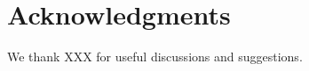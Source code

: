 \documentclass[useAMS,usenatbib]{mn2e}
\begin{document}

\section*{Acknowledgments}
 
We thank XXX for useful discussions and suggestions.



% 
% 
% 
% 





%


\label{lastpage}
\bsp
\end{document}
